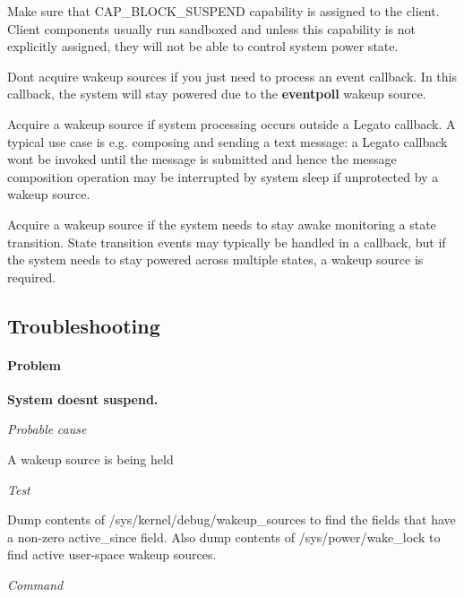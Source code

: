\begin{DoxyItemize}
\item Make sure that C\+A\+P\+\_\+\+B\+L\+O\+C\+K\+\_\+\+S\+U\+S\+P\+E\+N\+D capability is assigned to the client. Client components usually run sandboxed and unless this capability is not explicitly assigned, they will not be able to control system power state.
\item Don\textquotesingle{}t acquire wakeup sources if you just need to process an event callback. In this callback, the system will stay powered due to the {\bfseries eventpoll} wakeup source.
\item Acquire a wakeup source if system processing occurs outside a Legato callback. A typical use case is e.\+g. composing and sending a text message\+: a Legato callback won\textquotesingle{}t be invoked until the message is submitted and hence the message composition operation may be interrupted by system sleep if unprotected by a wakeup source.
\item Acquire a wakeup source if the system needs to stay awake monitoring a state transition. State transition events may typically be handled in a callback, but if the system needs to stay powered across multiple states, a wakeup source is required.
\end{DoxyItemize}\hypertarget{how_to_power_mgmt_howToPowerMgmt_troubleshooting}{}\subsection{Troubleshooting}\label{how_to_power_mgmt_howToPowerMgmt_troubleshooting}
\paragraph*{Problem }

{\bfseries System doesn\textquotesingle{}t suspend. }

{\itshape Probable} {\itshape cause} 

A wakeup source is being held ~\newline


{\itshape Test} 

Dump contents of /sys/kernel/debug/wakeup\+\_\+sources to find the fields that have a non-\/zero active\+\_\+since field. Also dump contents of {\ttfamily /sys/power/wake\+\_\+lock} to find active user-\/space wakeup sources. ~\newline


{\itshape Command} 

